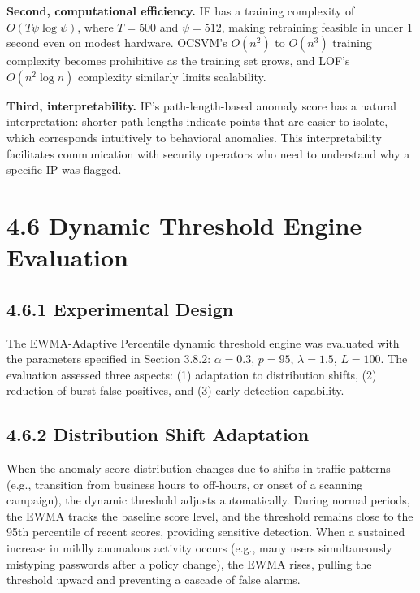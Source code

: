 \documentclass[
  a4paper]{report}
\begin{document}
\textbf{Second, computational efficiency.} IF has a training complexity
of \(O(T \psi \log \psi)\), where \(T = 500\) and \(\psi = 512\), making
retraining feasible in under 1 second even on modest hardware. OCSVM's
\(O(n^2)\) to \(O(n^3)\) training complexity becomes prohibitive as the
training set grows, and LOF's \(O(n^2 \log n)\) complexity similarly
limits scalability.

\textbf{Third, interpretability.} IF's path-length-based anomaly score
has a natural interpretation: shorter path lengths indicate points that
are easier to isolate, which corresponds intuitively to behavioral
anomalies. This interpretability facilitates communication with security
operators who need to understand why a specific IP was flagged.

\section{4.6 Dynamic Threshold Engine
Evaluation}\label{dynamic-threshold-engine-evaluation}

\subsection{4.6.1 Experimental Design}\label{experimental-design}

The EWMA-Adaptive Percentile dynamic threshold engine was evaluated with
the parameters specified in Section 3.8.2: \(\alpha = 0.3\), \(p = 95\),
\(\lambda = 1.5\), \(L = 100\). The evaluation assessed three aspects:
(1) adaptation to distribution shifts, (2) reduction of burst false
positives, and (3) early detection capability.

\subsection{4.6.2 Distribution Shift
Adaptation}\label{distribution-shift-adaptation}

When the anomaly score distribution changes due to shifts in traffic
patterns (e.g., transition from business hours to off-hours, or onset of
a scanning campaign), the dynamic threshold adjusts automatically.
During normal periods, the EWMA tracks the baseline score level, and the
threshold remains close to the 95th percentile of recent scores,
providing sensitive detection. When a sustained increase in mildly
anomalous activity occurs (e.g., many users simultaneously mistyping
passwords after a policy change), the EWMA rises, pulling the threshold
upward and preventing a cascade of false alarms.
\end{document}
